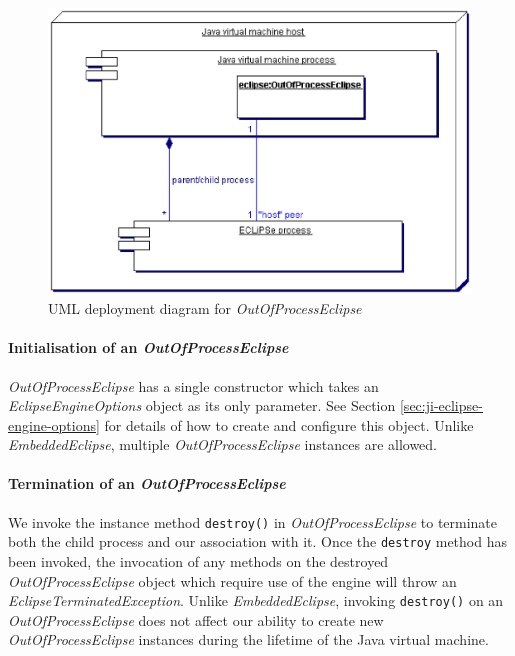 \begin{center}
  \begin{figure}[htb] 
  \begin{center} 
    \includegraphics{embjava-diagrams/outOfProcess-deployment.eps}
  \end{center}
  \caption{\label{fig:ji-outOfProcess-deployment}UML deployment
    diagram for {\it OutOfProcessEclipse}} \end{figure}
\end{center}


\paragraph{Initialisation of an {\it OutOfProcessEclipse}}

{\it OutOfProcessEclipse} has a single constructor which takes an {\it
EclipseEngineOptions} object as its only parameter. See Section
\ref{sec:ji-eclipse-engine-options} for details of how to create and
configure this object. Unlike {\it EmbeddedEclipse}, multiple {\it
OutOfProcessEclipse} instances are allowed.

\paragraph{Termination of an {\it OutOfProcessEclipse}}

We invoke the instance method {\tt destroy()} in {\it
OutOfProcessEclipse} to terminate both the child {\eclipse} process
and our association with it. Once the {\tt destroy} method has been
invoked, the invocation of any methods on the destroyed {\it
OutOfProcessEclipse} object which require use of the {\eclipse} engine will
throw an {\it EclipseTerminatedException}. Unlike {\it
EmbeddedEclipse}, invoking {\tt destroy()} on an {\it
OutOfProcessEclipse} does not affect our ability to create new {\it
OutOfProcessEclipse} instances during the lifetime of the Java virtual
machine.

